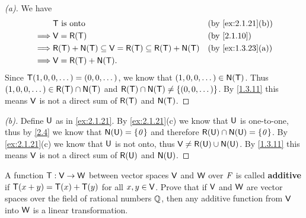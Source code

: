 \begin{proof}[(a)]
	We have
	\begin{align*}
		         & \T \text{ is onto}                                                   &  & \by{ex:2.1.21}[b] \\
		\implies & \V = \rg{\T}                                                         &  & \by{2.1.10}       \\
		\implies & \rg{\T} + \ns{\T} \subseteq \V = \rg{\T} \subseteq \rg{\T} + \ns{\T} &  & \by{ex:1.3.23}[a] \\
		\implies & \V = \rg{\T} + \ns{\T}.
	\end{align*}
	Since \(\mathsf{T}(1, 0, 0, \dots) = (0, 0, \dots)\), we know that \((1, 0, 0, \dots) \in \ns{\T}\).
	Thus \((1, 0, 0, \dots) \in \rg{\T} \cap \ns{\T}\) and \(\rg{\T} \cap \ns{\T} \neq \set{(0, 0, \dots)}\).
	By \cref{1.3.11} this means \(\mathsf{V}\) is not a direct sum of \(\rg{\T}\) and \(\ns{\T}\).
\end{proof}

\begin{proof}[(b)]
	Define \(\mathsf{U}\) as in \cref{ex:2.1.21}.
	By \cref{ex:2.1.21}(c) we know that \(\mathsf{U}\) is one-to-one, thus by \cref{2.4} we know that \(\ns{\U} = \set{\zv}\) and therefore \(\rg{\U} \cap \ns{\U} = \set{\zv}\).
	By \cref{ex:2.1.21}(c) we know that \(\mathsf{U}\) is not onto, thus \(\V \neq \rg{\U} \cup \ns{\U}\).
	By \cref{1.3.11} this means \(\mathsf{V}\) is not a direct sum of \(\rg{\U}\) and \(\ns{\U}\).
\end{proof}

\begin{ex}\label{ex:2.1.37}
	A function \(\mathsf{T} : \mathsf{V} \to \mathsf{W}\) between vector spaces \(\mathsf{V}\) and \(\mathsf{W}\) over \(\mathit{F}\) is called \textbf{additive} if \(\mathsf{T}(x + y) = \mathsf{T}(x) + \mathsf{T}(y)\) for all \(x, y \in \mathsf{V}\).
	Prove that if \(\mathsf{V}\) and \(\mathsf{W}\) are vector spaces over the field of rational numbers \(\mathbb{Q}\), then any additive function from \(\mathsf{V}\) into \(\mathsf{W}\) is a linear transformation.
\end{ex}

